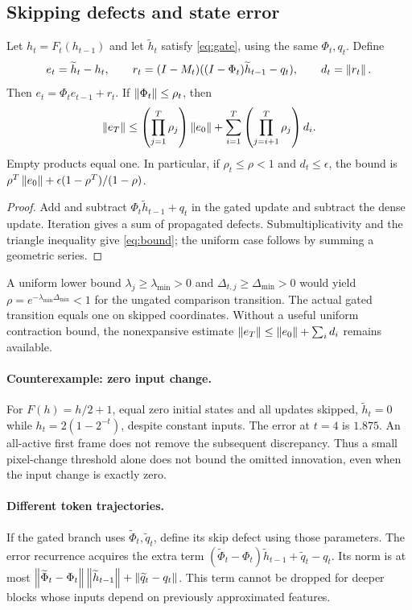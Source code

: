 \subsection{Skipping defects and state error}
\begin{Theorem}\label{thm:defect}
Let $h_t=F_t(h_{t-1})$ and let $\widetilde h_t$ satisfy
\eqref{eq:gate}, using the same $\Phi_t,q_t$. Define
\begin{equation}
 e_t=\widetilde h_t-h_t,\qquad
 r_t=(I-M_t)((I-\Phi_t)\widetilde h_{t-1}-q_t),\qquad d_t=\norm{r_t}.
\end{equation}
Then $e_t=\Phi_t e_{t-1}+r_t$. If $\norm{\Phi_t}\le\rho_t$, then
\begin{equation}\label{eq:bound}
 \norm{e_T}\le\left(\prod_{j=1}^T\rho_j\right)\norm{e_0}
 +\sum_{i=1}^T\left(\prod_{j=i+1}^T\rho_j\right)d_i.
\end{equation}
Empty products equal one. In particular, if $\rho_t\le\rho<1$ and
$d_t\le\epsilon$, the bound is
$\rho^T\norm{e_0}+\epsilon(1-\rho^T)/(1-\rho)$.
\end{Theorem}
\begin{proof}
Add and subtract $\Phi_t\widetilde h_{t-1}+q_t$ in the gated update and
subtract the dense update. Iteration gives a sum of propagated defects.
Submultiplicativity and the triangle inequality give \eqref{eq:bound};
the uniform case follows by summing a geometric series.
\end{proof}

A uniform lower bound $\lambda_j\ge\lambda_{\min}>0$ and
$\Delta_{t,j}\ge\Delta_{\min}>0$ would yield
$\rho=e^{-\lambda_{\min}\Delta_{\min}}<1$ for the ungated comparison
transition. The actual gated transition equals one on skipped coordinates.
Without a useful uniform contraction bound, the nonexpansive estimate
$\norm{e_T}\le\norm{e_0}+\sum_i d_i$ remains available.

\paragraph{Counterexample: zero input change.}
For $F(h)=h/2+1$, equal zero initial states and all updates skipped,
$\widetilde h_t=0$ while $h_t=2(1-2^{-t})$, despite constant inputs.
The error at $t=4$ is $1.875$. An all-active first frame does not remove
the subsequent discrepancy. Thus a small pixel-change threshold alone does
not bound the omitted innovation, even when the input change is exactly zero.

\paragraph{Different token trajectories.}
If the gated branch uses $\widetilde\Phi_t,\widetilde q_t$, define its skip
defect using those parameters. The error recurrence acquires the extra term
$(\widetilde\Phi_t-\Phi_t)\widetilde h_{t-1}+\widetilde q_t-q_t$.
Its norm is at most
$\norm{\widetilde\Phi_t-\Phi_t}\norm{\widetilde h_{t-1}}
+\norm{\widetilde q_t-q_t}$. This term cannot be dropped for deeper blocks
whose inputs depend on previously approximated features.

